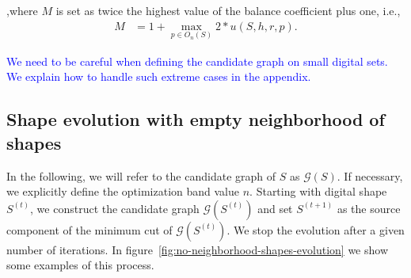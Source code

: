 \documentclass[smallextended]{svjour3}
\newcommand{\todo}[1]{{\textcolor{blue}{#1}}}
\begin{document}
,where $M$ is set as twice the highest value of the balance coefficient plus one, i.e.,
\begin{align*}
	M &= 1+\max_{p \in O_n(S)} 2*u(S,h,r,p).
\end{align*}

\todo{
We need to be careful when defining the candidate graph on small digital sets. We explain how to handle such extreme cases in the appendix.}

\subsection{Shape evolution with empty neighborhood of shapes}

In the following, we will refer to the candidate graph of $S$ as $\mathcal{G}(S)$. If necessary, we explicitly define the optimization band value $n$. Starting with digital shape $S^{(t)}$, we construct the candidate graph $\mathcal{G}(S^{(t)})$ and set $S^{(t+1)}$ as the source component of the minimum cut of $\mathcal{G}(S^{(t)})$. We stop the evolution after a given number of iterations.  In figure~\ref{fig:no-neighborhood-shapes-evolution} we show some examples of this process.
\end{document}
